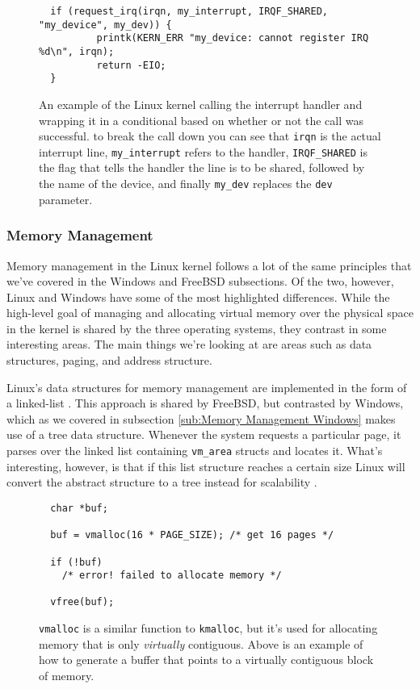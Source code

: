 \documentclass[10pt,draftclsnofoot,onecolumn]{IEEEtran}
\begin{document}
\begin{figure}[h]
\begin{lstlisting}
  if (request_irq(irqn, my_interrupt, IRQF_SHARED, "my_device", my_dev)) {
          printk(KERN_ERR "my_device: cannot register IRQ %d\n", irqn);
          return -EIO;
  }
\end{lstlisting}
\centering
\captionsetup{justification=centering}
\caption{
  An example of the Linux kernel calling the interrupt handler and wrapping it in a conditional based on whether or not the call was successful.
  to break the call down you can see that \texttt{irqn} is the actual interrupt line, \texttt{my\_interrupt} refers to the handler, \texttt{IRQF\_SHARED} is the flag that tells the handler the line is to be shared, followed by the name of the device, and finally \texttt{my\_dev} replaces the \texttt{dev} parameter.
}
\label{code:linux_handler}
\end{figure}

\subsubsection{Memory Management}
\label{sub:Memory Management Linux}
\par Memory management in the Linux kernel follows a lot of the same principles that we've covered in the Windows and FreeBSD subsections.
Of the two, however, Linux and Windows have some of the most highlighted differences.
While the high-level goal of managing and allocating virtual memory over the physical space in the kernel is shared by the three operating systems, they contrast in some interesting areas.
The main things we're looking at are areas such as data structures, paging, and address structure.

\par Linux's data structures for memory management are implemented in the form of a linked-list \cite{linux:1}.
This approach is shared by FreeBSD, but contrasted by Windows, which as we covered in subsection \ref{sub:Memory Management Windows} makes use of a tree data structure.
Whenever the system requests a particular page, it parses over the linked list containing \texttt{vm\_area} structs and locates it.
What's interesting, however, is that if this list structure reaches a certain size Linux will convert the abstract structure to a tree instead for scalability \cite{linux:1}.

\begin{figure}[h]
\begin{lstlisting}
  char *buf;

  buf = vmalloc(16 * PAGE_SIZE); /* get 16 pages */

  if (!buf)
    /* error! failed to allocate memory */

  vfree(buf);
\end{lstlisting}
\centering
\captionsetup{justification=centering}
\caption{
  \texttt{vmalloc} is a similar function to \texttt{kmalloc}, but it's used for allocating memory that is only \textit{virtually} contiguous.
  Above is an example of how to generate a buffer that points to a virtually contiguous block of memory.
}
\label{code:vmalloc}
\end{figure}
\end{document}
